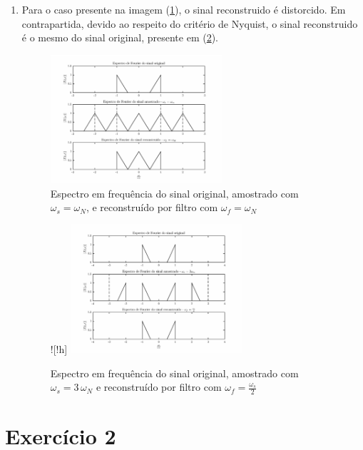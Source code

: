 \documentclass{article}
\begin{document}
\begin{enumerate}
\item %

Para o caso presente na imagem (\ref{fig:ex1d1}), o sinal reconstruido é distorcido. Em contrapartida, devido ao respeito do critério de Nyquist, o sinal reconstruido é o mesmo do sinal original, presente em (\ref{fig:ex1d2}).

\begin{figure}[!h]
    \centering
    \includegraphics[width=0.6\textwidth]{./images/ex1d1.eps}
    \caption{Espectro em frequência do sinal original, amostrado com $\omega_s = \omega_N$, e reconstruído por  filtro com $\omega_f = \omega_N$}
    \label{fig:ex1d1}
\end{figure}%

\begin{figure}![!h]
    \centering
    \includegraphics[width=0.6\textwidth]{./images/ex1d2.eps}
    \caption{Espectro em frequência do sinal original, amostrado com $\omega_s = 3 \, \omega_N$ e reconstruído por  filtro com $\omega_f = \frac{\omega_s}{2}$}
    \label{fig:ex1d2}
\end{figure}

\end{enumerate}

\section*{Exercício 2}
\end{document}
